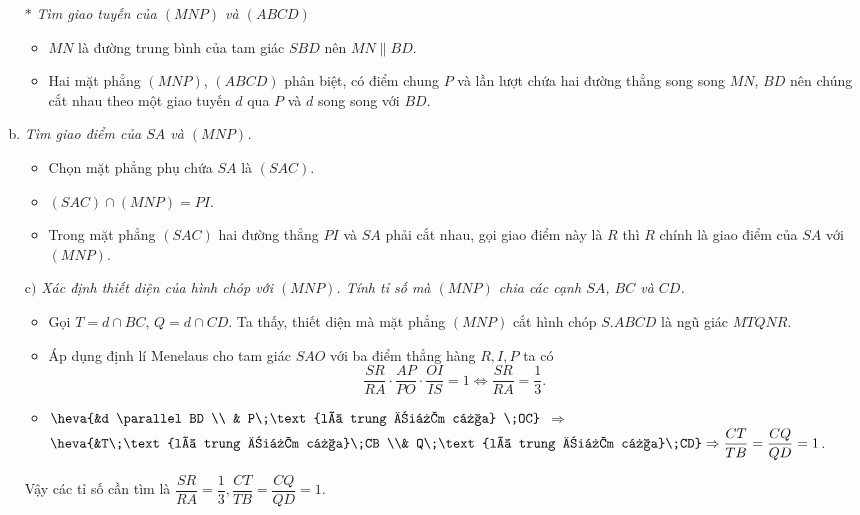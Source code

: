 \begin{bt}
{		\begin{enumerate}[b)]
			\item[$*$] \textit{Tìm giao tuyến của  $(MNP)$ và $(ABCD)$}
			\begin{itemize}
				\item $MN$ là đường trung bình của tam giác $SBD$ nên $MN \parallel BD$.
				\item Hai mặt phẳng $(MNP)$, $(ABCD)$ phân biệt, có điểm chung $P$ và lần lượt chứa hai đường thẳng song song $MN$, $BD$ nên chúng cắt nhau theo một giao tuyến $d$ qua $P$ và $d$ song song với $BD$.
			\end{itemize}
			\item \textit{ Tìm giao điểm của $SA$ và $(MNP)$.}
			\begin{itemize}
				\item  Chọn mặt phẳng phụ chứa $SA$ là $(SAC)$.
				\item $(SAC)\cap (MNP)=PI$.
				\item Trong mặt phẳng $(SAC)$ hai đường thẳng $PI$ và $SA$ phải cắt nhau, gọi giao điểm này là $R$ thì $R$ chính là giao điểm của $SA$ với $(MNP)$.
			\end{itemize}
			\item[$\text{c})$]  \textit{Xác định thiết diện của hình chóp với $(MNP)$. Tính tỉ số mà $(MNP)$ chia các cạnh $SA$, $BC$ và $CD$.}
			\begin{itemize}
				\item  Gọi $T=d\cap BC$, $Q=d\cap CD$. Ta thấy, thiết diện mà mặt phẳng $(MNP)$ cắt hình chóp $S.ABCD$ là ngũ giác $MTQNR$.
				\item 	Áp dụng định lí Menelaus cho tam giác $SAO$ với ba điểm thẳng hàng $R, I, P$ ta có
				$$\dfrac{SR}{RA}\cdot\dfrac{AP}{PO}\cdot\dfrac{OI}{IS}=1\Leftrightarrow \dfrac{SR}{RA}=\dfrac{1}{3}.$$
				\item $\heva{&d \parallel BD \\
					& P\;\text{là trung điểm của} \;OC}$ $\Rightarrow$ $\heva{&T\;\text{là trung điểm của}\;CB \\& Q\;\text{là trung điểm của}\;CD}\Rightarrow \dfrac{CT}{TB}=\dfrac{CQ}{QD}=1$.
			\end{itemize}
			Vậy các tỉ số cần tìm là  $\dfrac{SR}{RA}=\dfrac{1}{3}, \dfrac{CT}{TB}=\dfrac{CQ}{QD}=1.$
	\end{enumerate}}
\end{bt}
